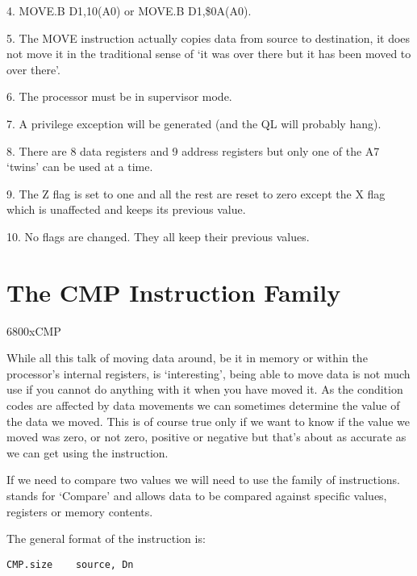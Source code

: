 4. MOVE.B D1,10(A0) or MOVE.B D1,\$0A(A0).

5. The MOVE instruction actually copies data from source to
      destination, it does not move it in the traditional sense of `it was
      over there but it has been moved to over there'.

6. The processor must be in supervisor mode.

7. A privilege exception will be generated (and the QL will
      probably hang).

8. There are 8 data registers and 9 address registers but only one
      of the A7 `twins' can be used at a time.

9. The Z flag is set to one and all the rest are reset to zero
      except the X flag which is unaffected and keeps its previous
      value.

10. No flags are changed. They all keep their previous
      values.

\section{The CMP Instruction Family}\mc6800x{CMP}
\label{ch2-cmp}%

While all this talk of moving data around, be it in memory or within
    the processor's internal registers, is `interesting', being able to move
    data is not much use if you cannot do anything with it when you have moved
    it. As the condition codes are affected by data movements we can sometimes
    determine the value of the data we moved. This is of course true only if
    we want to know if the value we moved was zero, or not zero, positive or
    negative but that's about as accurate as we can get using the 
    instruction.

If we need to compare two values we will need to use the  family
    of instructions.  stands for `Compare' and allows data to be compared
    against specific values, registers or memory contents.

The general format of the  instruction is:

\begin{lstlisting}[firstnumber=1,]
          CMP.size    source, Dn
\end{lstlisting}

